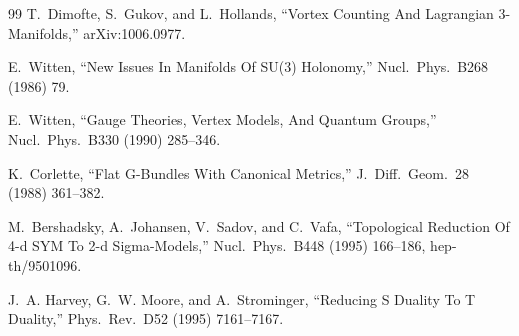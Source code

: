 \documentclass[11pt,a4paper,UTF8]{ctexart}
\theoremstyle{plain}
\theoremstyle{definition}
\begin{document}
\begin{thebibliography}{99}
 T.~Dimofte, S.~Gukov, and L.~Hollands, ``Vortex Counting And
  Lagrangian 3-Manifolds,'' arXiv:1006.0977.

 E.~Witten, ``New Issues In Manifolds Of SU(3) Holonomy,''
  Nucl.\ Phys.\ B268 (1986) 79.

 E.~Witten, ``Gauge Theories, Vertex Models, And Quantum
  Groups,'' Nucl.\ Phys.\ B330 (1990) 285--346.

 K.~Corlette, ``Flat G-Bundles With Canonical Metrics,''
  J.\ Diff.\ Geom.\ 28 (1988) 361--382.

 M.~Bershadsky, A.~Johansen, V.~Sadov, and C.~Vafa,
  ``Topological Reduction Of 4-d SYM To 2-d Sigma-Models,'' Nucl.\ Phys.\
  B448 (1995) 166--186, hep-th/9501096.

 J.~A. Harvey, G.~W. Moore, and A.~Strominger, ``Reducing S
  Duality To T Duality,'' Phys.\ Rev.\ D52 (1995) 7161--7167.

\end{thebibliography}
\end{document}
